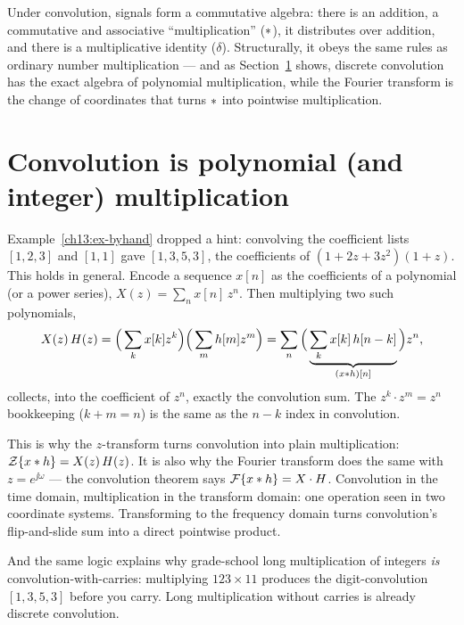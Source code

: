 \begin{aestheticbox}
Under convolution, signals form a
commutative algebra: there is an addition, a commutative and associative
``multiplication'' ($\ast$), it distributes over addition, and there is a
multiplicative identity ($\delta$). Structurally, it obeys the same rules as ordinary
number multiplication --- and as Section~\ref{ch13:polynomial} shows, discrete convolution
has the exact algebra of polynomial multiplication, while the Fourier transform is the
change of coordinates that turns $\ast$ into pointwise multiplication.
\end{aestheticbox}

\section{Convolution is polynomial (and integer) multiplication}
\label{ch13:polynomial}

Example~\ref{ch13:ex-byhand} dropped a hint: convolving the coefficient lists
$[1,2,3]$ and $[1,1]$ gave $[1,3,5,3]$, the coefficients of
$(1+2z+3z^2)(1+z)$. This holds in general. Encode a sequence $x[n]$ as
the coefficients of a polynomial (or a power series), $X(z) = \sum_n x[n]\,z^n$.
Then multiplying two such polynomials,
\[
X(z)\,H(z) = \Big(\sum_k x[k]z^k\Big)\Big(\sum_m h[m]z^m\Big)
           = \sum_n \Big(\underbrace{\sum_k x[k]\,h[n-k]}_{(x\ast h)[n]}\Big) z^n,
\]
collects, into the coefficient of $z^n$, exactly the convolution sum. The
$z^k \cdot z^m = z^{n}$ bookkeeping ($k+m=n$) is the same as the $n-k$ index in
convolution.

\begin{whybox}
This is why the $z$-transform turns convolution into plain multiplication:
$\mathcal{Z}\{x \ast h\} = X(z)\,H(z)$. It is also why the Fourier transform does the
same with $z = e^{\jj\omega}$ --- the convolution theorem says
$\mathcal{F}\{x\ast h\} = X\cdot H$. Convolution in the time domain, multiplication in
the transform domain: one operation seen in two coordinate systems. Transforming
to the frequency domain turns convolution's flip-and-slide sum into a direct
pointwise product.
\end{whybox}

And the same logic explains why grade-school long multiplication of integers
\emph{is} convolution-with-carries: multiplying $123 \times 11$ produces the
digit-convolution $[1,3,5,3]$ before you carry. Long multiplication without carries
is already discrete convolution.

